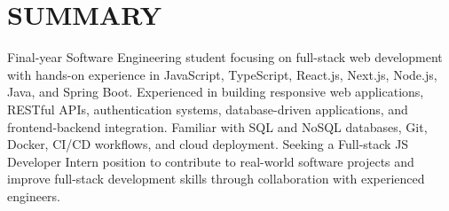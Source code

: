 \section{SUMMARY}
\small
\noindent Final-year Software Engineering student focusing on full-stack web development with hands-on experience in JavaScript, TypeScript, React.js, Next.js, Node.js, Java, and Spring Boot. Experienced in building responsive web applications, RESTful APIs, authentication systems, database-driven applications, and frontend-backend integration. Familiar with SQL and NoSQL databases, Git, Docker, CI/CD workflows, and cloud deployment. Seeking a Full-stack JS Developer Intern position to contribute to real-world software projects and improve full-stack development skills through collaboration with experienced engineers.

\normalsize
